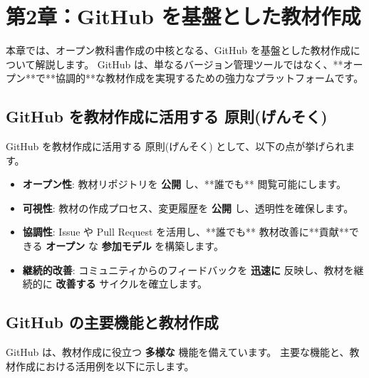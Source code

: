 \section{第2章：GitHub を基盤とした教材作成}

本章では、オープン教科書作成の中核となる、GitHub を基盤とした教材作成について解説します。
GitHub は、単なるバージョン管理ツールではなく、**オープン**で**協調的**な教材作成を実現するための強力なプラットフォームです。

\subsection{GitHub を教材作成に活用する 原則(げんそく)}

GitHub を教材作成に活用する 原則(げんそく) として、以下の点が挙げられます。

\begin{itemize}
    \item \textbf{オープン性}: 教材リポジトリを \textbf{公開} し、**誰でも** 閲覧可能にします。
    \item \textbf{可視性}: 教材の作成プロセス、変更履歴を \textbf{公開} し、透明性を確保します。
    \item \textbf{協調性}: Issue や Pull Request を活用し、**誰でも** 教材改善に**貢献**できる \textbf{オープン} な \textbf{参加モデル} を構築します。
    \item \textbf{継続的改善}: コミュニティからのフィードバックを \textbf{迅速に} 反映し、教材を継続的に \textbf{改善する} サイクルを確立します。
\end{itemize}

\subsection{GitHub の主要機能と教材作成}

GitHub は、教材作成に役立つ \textbf{多様な} 機能を備えています。
主要な機能と、教材作成における活用例を以下に示します。


